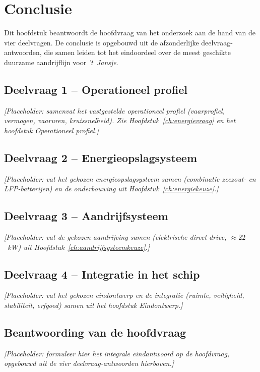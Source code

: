 \chapter{Conclusie}
\label{ch:conclusie}

\noindent Dit hoofdstuk beantwoordt de hoofdvraag van het onderzoek aan de hand
van de vier deelvragen. De conclusie is opgebouwd uit de afzonderlijke
deelvraag-antwoorden, die samen leiden tot het eindoordeel over de meest
geschikte duurzame aandrijflijn voor \emph{'t~Jansje}.

\section{Deelvraag 1 -- Operationeel profiel}
\noindent\textit{[Placeholder: samenvat het vastgestelde operationeel profiel
(vaarprofiel, vermogen, vaaruren, kruissnelheid). Zie Hoofdstuk~\ref{ch:energievraag}
en het hoofdstuk Operationeel profiel.]}

\section{Deelvraag 2 -- Energieopslagsysteem}
\noindent\textit{[Placeholder: vat het gekozen energieopslagsysteem samen
(combinatie zeezout- en LFP-batterijen) en de onderbouwing uit
Hoofdstuk~\ref{ch:energiekeuze}.]}

\section{Deelvraag 3 -- Aandrijfsysteem}
\noindent\textit{[Placeholder: vat de gekozen aandrijving samen (elektrische
direct-drive, $\approx 22$~kW) uit Hoofdstuk~\ref{ch:aandrijfsysteemkeuze}.]}

\section{Deelvraag 4 -- Integratie in het schip}
\noindent\textit{[Placeholder: vat het gekozen eindontwerp en de integratie
(ruimte, veiligheid, stabiliteit, erfgoed) samen uit het hoofdstuk Eindontwerp.]}

\section{Beantwoording van de hoofdvraag}
\noindent\textit{[Placeholder: formuleer hier het integrale eindantwoord op de
hoofdvraag, opgebouwd uit de vier deelvraag-antwoorden hierboven.]}
